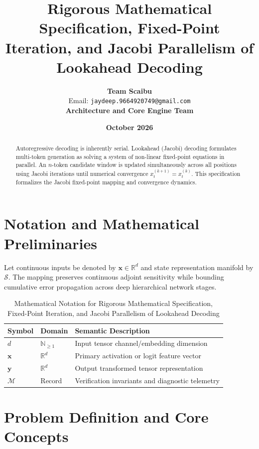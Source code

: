 \documentclass[11pt,a4paper]{article}
\title{\textbf{Rigorous Mathematical Specification, Fixed-Point Iteration, and Jacobi Parallelism of Lookahead Decoding}}
\author{\textbf{Team Scaibu} \\ \small Email: \texttt{jaydeep.9664920749@gmail.com} \\ \small \textbf{Architecture and Core Engine Team}}
\date{\textbf{October 2026}}
\theoremstyle{definition}
\begin{document}
\maketitle

\begin{abstract}
Autoregressive decoding is inherently serial. Lookahead (Jacobi) decoding formulates multi-token generation as solving a system of non-linear fixed-point equations in parallel. An $n$-token candidate window is updated simultaneously across all positions using Jacobi iterations until numerical convergence $x_t^{(k+1)} = x_t^{(k)}$. This specification formalizes the Jacobi fixed-point mapping and convergence dynamics.
\end{abstract}

\section{Notation and Mathematical Preliminaries}

Let continuous inputs be denoted by $\mathbf{x} \in \mathbb{R}^d$ and state representation manifold by $\mathcal{S}$. The mapping preserves continuous adjoint sensitivity while bounding cumulative error propagation across deep hierarchical network stages.

\begin{table}[h]
\centering
\caption{Mathematical Notation for Rigorous Mathematical Specification, Fixed-Point Iteration, and Jacobi Parallelism of Lookahead Decoding}
\begin{tabular}{lll}
\toprule
\textbf{Symbol} & \textbf{Domain} & \textbf{Semantic Description} \\
\midrule
$d$ & $\mathbb{N}_{\ge 1}$ & Input tensor channel/embedding dimension \\
$\mathbf{x}$ & $\mathbb{R}^d$ & Primary activation or logit feature vector \\
$\mathbf{y}$ & $\mathbb{R}^d$ & Output transformed tensor representation \\
$\mathcal{M}$ & Record & Verification invariants and diagnostic telemetry \\
\bottomrule
\end{tabular}
\end{table}

\section{Problem Definition and Core Concepts}
\end{document}
